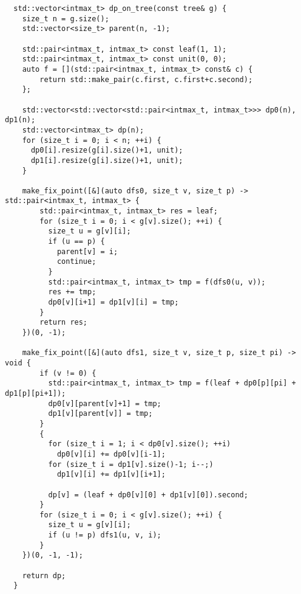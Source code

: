 \documentclass{jsarticle}
\begin{document}
\begin{verbatim}
  std::vector<intmax_t> dp_on_tree(const tree& g) {
    size_t n = g.size();
    std::vector<size_t> parent(n, -1);
  
    std::pair<intmax_t, intmax_t> const leaf(1, 1);
    std::pair<intmax_t, intmax_t> const unit(0, 0);
    auto f = [](std::pair<intmax_t, intmax_t> const& c) {
        return std::make_pair(c.first, c.first+c.second);
    };
  
    std::vector<std::vector<std::pair<intmax_t, intmax_t>>> dp0(n), dp1(n);
    std::vector<intmax_t> dp(n);
    for (size_t i = 0; i < n; ++i) {
      dp0[i].resize(g[i].size()+1, unit);
      dp1[i].resize(g[i].size()+1, unit);
    }
  
    make_fix_point([&](auto dfs0, size_t v, size_t p) -> std::pair<intmax_t, intmax_t> {
        std::pair<intmax_t, intmax_t> res = leaf;
        for (size_t i = 0; i < g[v].size(); ++i) {
          size_t u = g[v][i];
          if (u == p) {
            parent[v] = i;
            continue;
          }
          std::pair<intmax_t, intmax_t> tmp = f(dfs0(u, v));
          res += tmp;
          dp0[v][i+1] = dp1[v][i] = tmp;
        }
        return res;
    })(0, -1);
  
    make_fix_point([&](auto dfs1, size_t v, size_t p, size_t pi) -> void {
        if (v != 0) {
          std::pair<intmax_t, intmax_t> tmp = f(leaf + dp0[p][pi] + dp1[p][pi+1]);
          dp0[v][parent[v]+1] = tmp;
          dp1[v][parent[v]] = tmp;
        }
        {
          for (size_t i = 1; i < dp0[v].size(); ++i)
            dp0[v][i] += dp0[v][i-1];
          for (size_t i = dp1[v].size()-1; i--;)
            dp1[v][i] += dp1[v][i+1];
    
          dp[v] = (leaf + dp0[v][0] + dp1[v][0]).second;
        }
        for (size_t i = 0; i < g[v].size(); ++i) {
          size_t u = g[v][i];
          if (u != p) dfs1(u, v, i);
        }
    })(0, -1, -1);
  
    return dp;
  }
\end{verbatim}
\end{document}
